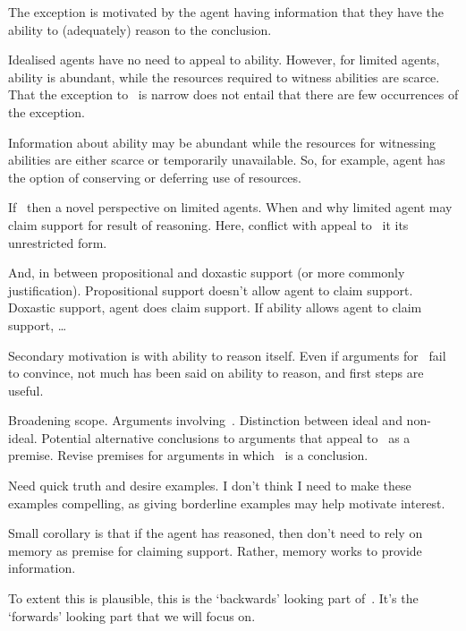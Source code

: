 \begin{note}[Ability]
  The exception is motivated by the agent having information that they have the ability to (adequately) reason to the conclusion.

  Idealised agents have no need to appeal to ability.
  However, for limited agents, ability is abundant, while the resources required to witness abilities are scarce.
  That the exception to~\uRa{} is narrow does not entail that there are few occurrences of the exception.

  Information about ability may be abundant while the resources for witnessing abilities are either scarce or temporarily unavailable.
  So, for example, agent has the option of conserving or deferring use of resources.

  If~\rC{} then a novel perspective on limited agents.
  When and why limited agent may claim support for result of reasoning.
  Here, conflict with appeal to~\uRa{} it its unrestricted form.

  And, in between propositional and doxastic support (or more commonly justification).
  Propositional support doesn't allow agent to claim support.
  Doxastic support, agent does claim support.
  If ability allows agent to claim support, \dots

  Secondary motivation is with ability to reason itself.
  Even if arguments for~\rC{} fail to convince, not much has been said on ability to reason, and first steps are useful.
\end{note}

\begin{note}
  Broadening scope.
  Arguments involving~\uRa{}.
  Distinction between ideal and non-ideal.
  Potential alternative conclusions to arguments that appeal to~\uRa{} as a premise.
  Revise premises for arguments in which~\uRa{} is a conclusion.
\end{note}

\begin{note}[Examples]
  Need quick truth and desire examples.
  I don't think I need to make these examples compelling, as giving borderline examples may help motivate interest.
\end{note}

\begin{note}
  Small corollary is that if the agent has reasoned, then don't need to rely on memory as premise for claiming support.
  Rather, memory works to provide information.

  To extent this is plausible, this is the `backwards' looking part of~\rC{}.
  It's the `forwards' looking part that we will focus on.
\end{note}

